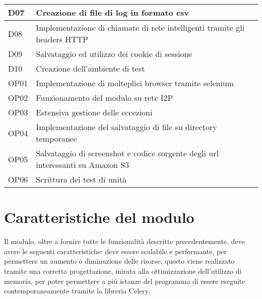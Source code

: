 \begin{longtable}{|p{}|p{}|}
    \hline
    D07			&	Creazione di file di log in formato csv \\
    \hline
    D08			&	Implementazione di chiamate di rete intelligenti tramite gli headers HTTP \\
    \hline
    D09			&	Salvataggio ed utilizzo dei cookie di sessione \\
    \hline
    D10			&	Creazione dell'ambiente di test \\
    \hline
    OP01		&	Implementazione di molteplici browser tramite selenium \\
    \hline
    OP02		&	Funzionamento del modulo su rete I2P \\
    \hline
    OP03		&	Estensiva gestione delle eccezioni \\
    \hline
    OP04		&	Implementazione del salvataggio di file su directory temporanee \\
    \hline
    OP05		&	Salvataggio di screenshot e codice sorgente degli url interessanti su Amazon S3 \\
    \hline
    OP06		&	Scrittura dei test di unità \\
    \hline
\end{longtable}%

\section{Caratteristiche del modulo}

Il modulo, oltre a fornire tutte le funzionalità descritte precedentemente, deve avere le
seguenti caratteristiche: deve essere scalabile e performante, per permettere un aumento o diminuzione delle risorse; questo viene realizzato tramite una corretta progettazione, mirata alla ottimizzazione dell'utilizzo di memoria, per poter permettere a più istanze del programma di essere eseguite contemporaneamente tramite la libreria Celery.